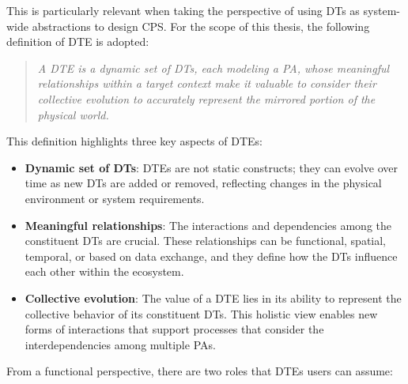 This is particularly relevant when taking the perspective of using \acp{DT} as system-wide abstractions to design \ac{CPS}. 
%
For the scope of this thesis, the following definition of \acl{DTE} is adopted:
%
\begin{quote}
\emph{
A \acl{DTE} is a dynamic set of \aclp{DT}, each modeling a \acl{PA}, whose meaningful relationships within a target context make it valuable to consider their collective evolution to accurately represent the mirrored portion of the physical world.
}
\end{quote}
%
This definition highlights three key aspects of \aclp{DTE}:
\begin{itemize}
    \item \textbf{Dynamic set of \aclp{DT}}: \acp{DTE} are not static constructs; they can evolve over time as new \acp{DT} are added or removed, reflecting changes in the physical environment or system requirements.
    
    \item \textbf{Meaningful relationships}: The interactions and dependencies among the constituent \acp{DT} are crucial. These relationships can be functional, spatial, temporal, or based on data exchange, and they define how the \acp{DT} influence each other within the ecosystem.
    
    \item \textbf{Collective evolution}: The value of a \ac{DTE} lies in its ability to represent the collective behavior of its constituent \acp{DT}. This holistic view enables new forms of interactions that support processes that consider the interdependencies among multiple \acp{PA}.
\end{itemize}

From a functional perspective, there are two roles that \acp{DTE} users can assume: 

